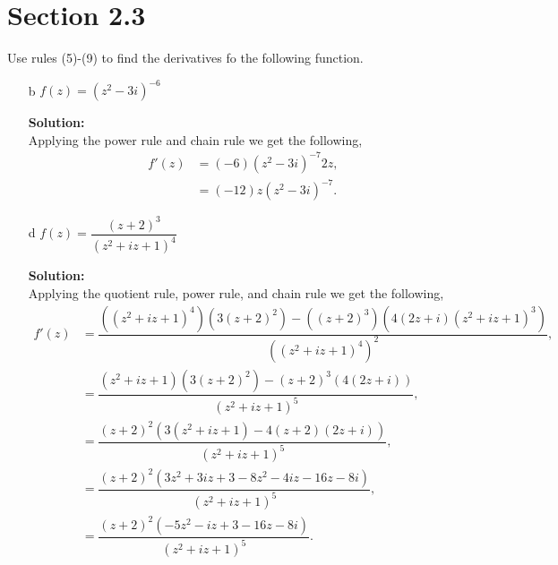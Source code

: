 \documentclass[12pt]{article}
\makeatletter
\theoremstyle{homework}
\newenvironment{exercise}[1]
{\def\@currentlabel{#1}\exercisecore}
{\endexercisecore}
\newcommand{\localhead}[1]{\par\smallskip\noindent\textbf{#1}\nobreak\\}%
\newcommand\solution{\localhead{Solution:}}
\makeatother
\begin{document}
\section*{Section 2.3}
\begin{exercise}{7} Use rules (5)-(9) to find the derivatives fo the following function.
  \begin{enumerate}
    \item[b] $f(z) = (z^2 - 3i)^{-6}$ 
    \solution Applying the power rule and chain rule we get the following, 
    \begin{align*}
      f'(z) &= (-6)(z^2 - 3i)^{-7} 2z,\\
      &= (-12)z(z^2 - 3i)^{-7}.
    \end{align*}
    \vspace{.15in}
    
    
    \item[d] $f(z) = \dfrac{(z + 2)^3}{(z^2 + iz + 1)^4}$
    \solution  Applying the quotient rule, power rule, and chain rule we get the following, 
    \begin{align*}
      f'(z) &= \dfrac{ ((z^2 + iz + 1)^4)(3(z + 2)^2) - ((z + 2)^3)(4(2z + i)(z^2 + iz + 1)^3)}{  ((z^2 + iz + 1)^4)^2},\\
            &= \dfrac{(z^2 + iz + 1)(3(z + 2)^2) - (z + 2)^3(4(2z + i))}{(z^2 + iz + 1)^5},\\
            &= \dfrac{ (z + 2)^2 (3(z^2 + iz + 1) - 4(z + 2)(2z + i))}{(z^2 + iz + 1)^5},\\
            &= \dfrac{ (z + 2)^2 (3z^2 + 3iz + 3 - 8z^2 - 4iz - 16z - 8i)}{(z^2 + iz + 1)^5},\\
            &= \dfrac{ (z + 2)^2 (-5z^2 -iz + 3 - 16z - 8i)}{(z^2 + iz + 1)^5}.
    \end{align*}
  \end{enumerate}
  \end{exercise}
  \vspace{.5in}
\end{document}
